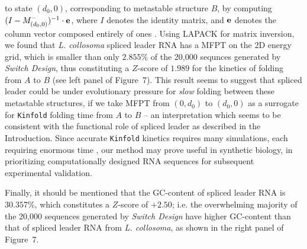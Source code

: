  to state $(d_0,0)$, corresponding to metastable structure $B$,  by
computing $(I - M^{-}_{(d_0,0)})^{-1} \cdot {\bf e}$, where
$I$ denotes the identity matrix, and ${\bf e}$ denotes the column vector
composed entirely of ones \cite{meyerMFPT}. Using LAPACK \cite{LAPACK}
for matrix inversion, we found that
{\em L. collosoma} spliced leader RNA has a
MFPT on the 2D energy grid, which is smaller than only $2.855\%$ of the
20,000 sequnces generated by {\em Switch Design}, thus constituting a
$Z$-score of $1.989$ for the kinetics of folding from $A$ to $B$
(see left panel of Figure~7).
This result seems to suggest that spliced leader could be
under evolutionary pressure for {\em slow} folding between these
metastable structures, if we take
MFPT from $(0,d_0)$ to $(d_0,0)$ as a surrogate for {\tt Kinfold} \cite{flamm}
folding time from $A$ to $B$ -- an interpretation which seems to be
consistent with the functional role of spliced leader as described
in the Introduction.
Since accurate {\tt Kinfold} kinetics requires many simulations,
each requiring enormous time \cite{wolfingerStadler:kinetics},
our method may prove useful in synthetic biology, in prioritizing
computationally designed RNA sequences for subsequent
experimental validation.

Finally, it should be mentioned that the GC-content of spliced leader
RNA is
$30.357\%$, which constitutes a $Z$-score of
$+2.50$; i.e. the overwhelming majority of the 20,000 sequences generated
by {\em Switch Design} have higher GC-content than that of spliced leader
RNA from {\em L. collosoma}, as shown in the right panel of
Figure~7.

